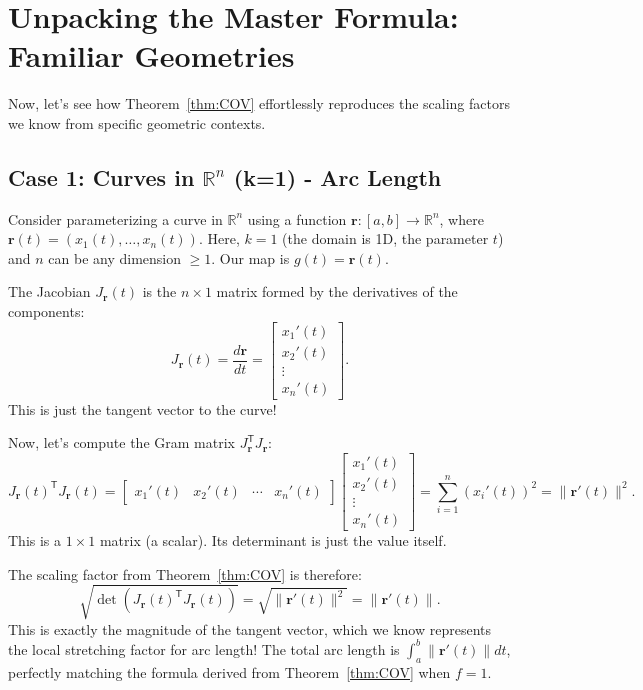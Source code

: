 \documentclass[12pt]{article}
\theoremstyle{definition} %
\theoremstyle{plain} %
\theoremstyle{remark} %
\begin{document}
\section{Unpacking the Master Formula: Familiar Geometries}

Now, let's see how Theorem~\ref{thm:COV} effortlessly reproduces the scaling factors we know from specific geometric contexts.

\subsection{Case 1: Curves in \texorpdfstring{$\mathbb{R}^n$}{R^n} (k=1) - Arc Length}

Consider parameterizing a curve in $\mathbb{R}^n$ using a function $\mathbf{r}: [a, b] \to \mathbb{R}^n$, where $\mathbf{r}(t) = (x_1(t), \dots, x_n(t))$. Here, $k=1$ (the domain is 1D, the parameter $t$) and $n$ can be any dimension $\ge 1$. Our map is $g(t) = \mathbf{r}(t)$.

The Jacobian $J_{\mathbf{r}}(t)$ is the $n \times 1$ matrix formed by the derivatives of the components:
\[
    J_{\mathbf{r}}(t) = \frac{d\mathbf{r}}{dt} = \begin{bmatrix} x_1'(t) \\ x_2'(t) \\ \vdots \\ x_n'(t) \end{bmatrix}.
\]
This is just the tangent vector to the curve!

Now, let's compute the Gram matrix $J_{\mathbf{r}}^{\mathsf{T}} J_{\mathbf{r}}$:
\[
    J_{\mathbf{r}}(t)^{\mathsf{T}} J_{\mathbf{r}}(t) =
    \begin{bmatrix} x_1'(t) & x_2'(t) & \cdots & x_n'(t) \end{bmatrix}
    \begin{bmatrix} x_1'(t) \\ x_2'(t) \\ \vdots \\ x_n'(t) \end{bmatrix}
    = \sum_{i=1}^{n} (x_i'(t))^2 = \|\mathbf{r}'(t)\|^2.
\]
This is a $1 \times 1$ matrix (a scalar). Its determinant is just the value itself.

The scaling factor from Theorem~\ref{thm:COV} is therefore:
\[
    \sqrt{\det(J_{\mathbf{r}}(t)^{\mathsf{T}} J_{\mathbf{r}}(t))} = \sqrt{\|\mathbf{r}'(t)\|^2} = \|\mathbf{r}'(t)\|.
\]
This is exactly the magnitude of the tangent vector, which we know represents the local stretching factor for arc length! The total arc length is $\int_a^b \|\mathbf{r}'(t)\| dt$, perfectly matching the formula derived from Theorem~\ref{thm:COV} when $f=1$.
\end{document}
